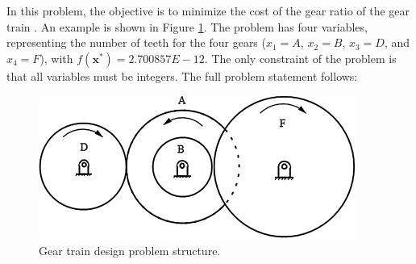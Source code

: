 
In this problem, the objective is to minimize the cost of the gear ratio of the gear train \citep{PV}. An example is shown in Figure \ref{fig:GT}. The problem has four variables, representing the number of teeth for the four gears ($x_1 = A$, $x_2 = B$, $x_3 = D$, and $x_4 = F$), with $f(\bm{x}^*) = 2.700857E \! - \! 12$. The only constraint of the problem is that all variables must be integers. The full problem statement follows:

\vspace{-0.5cm}



\vspace{0.5cm}


\begin{figure}[h]
    \begin{center}
    \includegraphics[scale=0.6]{Imgs/GT.jpg}
    \end{center}
    \captionsetup{justification=centering}
    \caption{Gear train design problem structure.}\label{fig:GT}
\end{figure}
